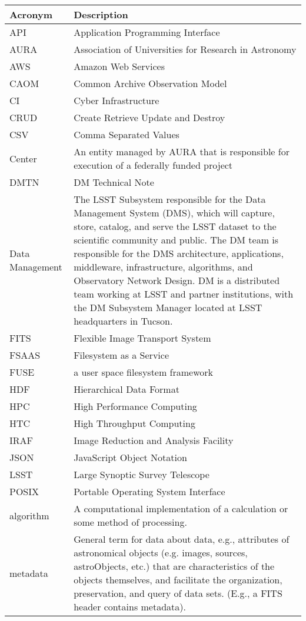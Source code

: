 \addtocounter{table}{-1}
\begin{longtable}{|l|p{}|}\hline
\textbf{Acronym} & \textbf{Description}  \\\hline

API & Application Programming Interface \\\hline
AURA & Association of Universities for Research in Astronomy \\\hline
AWS & Amazon Web Services \\\hline
CAOM & Common Archive Observation Model \\\hline
CI & Cyber Infrastructure \\\hline
CRUD & Create Retrieve Update and Destroy \\\hline
CSV & Comma Separated Values \\\hline
Center & An entity managed by AURA that is responsible for execution of a federally funded project \\\hline
DMTN & DM Technical Note \\\hline
Data Management & The LSST Subsystem responsible for the Data Management System (DMS), which will capture, store, catalog, and serve the LSST dataset to the scientific community and public. The DM team is responsible for the DMS architecture, applications, middleware, infrastructure, algorithms, and Observatory Network Design. DM is a distributed team working at LSST and partner institutions, with the DM Subsystem Manager located at LSST headquarters in Tucson. \\\hline
FITS & Flexible Image Transport System \\\hline
FSAAS & Filesystem as a Service \\\hline
FUSE & a user space filesystem framework \\\hline
HDF & Hierarchical Data Format \\\hline
HPC & High Performance Computing \\\hline
HTC & High Throughput Computing \\\hline
IRAF & Image Reduction and Analysis Facility \\\hline
JSON & JavaScript Object Notation \\\hline
LSST & Large Synoptic Survey Telescope \\\hline
POSIX & Portable Operating System Interface \\\hline
algorithm & A computational implementation of a calculation or some method of processing. \\\hline
metadata & General term for data about data, e.g., attributes of astronomical objects (e.g. images, sources, astroObjects, etc.) that are characteristics of the objects themselves, and facilitate the organization, preservation, and query of data sets. (E.g., a FITS header contains metadata). \\\hline

\end{longtable}
